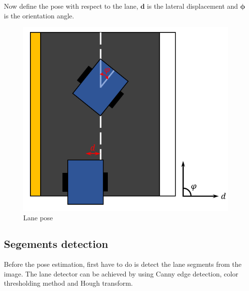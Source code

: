 \documentclass{article}
\begin{document}
\noindent Now define the pose with respect to the lane, $\bm{d}$ is the lateral displacement and $\bm{\phi}$ is the orientation angle.


\begin{figure}[ht]
  \label{fig:lane_pose}
  \centering
  \includegraphics[scale=0.7]{graphs/lane_pose.PNG}
  \caption{Lane pose}
\end{figure}
\FloatBarrier

\subsection{Segements detection}

Before the pose estimation, first have to do is detect the lane segments from the image. The lane detector can be achieved by using Canny edge detection, color thresholding method and Hough transform.
\end{document}
